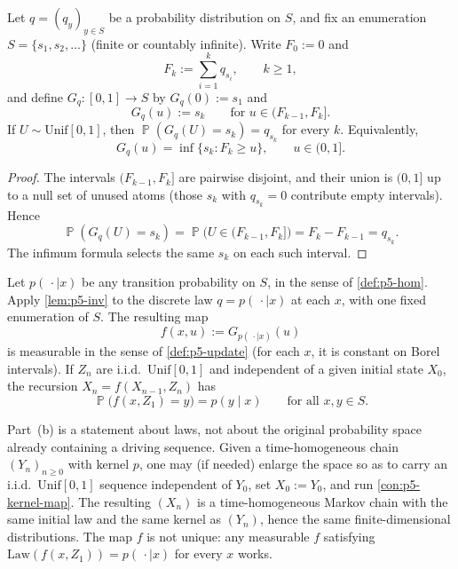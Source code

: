 \documentclass[11pt,a4paper]{article}
\DeclareMathOperator{\Pbb}{\mathbb{P}}
\begin{document}
\begin{lemma}
\label{lem:p5-inv}
Let \(q=(q_y)_{y\in S}\) be a probability distribution on \(S\), and fix an enumeration \(S=\{s_1,s_2,\dots\}\) (finite or countably infinite). Write \(F_0:=0\) and
\[
F_k
:=
\sum_{i=1}^{k}q_{s_i},
\qquad k\ge 1,
\]
and define \(G_q:[0,1]\to S\) by \(G_q(0):=s_1\) and
\[
G_q(u)
:=
s_k
\qquad\text{for }u\in(F_{k-1},F_k].
\]
If \(U\sim\mathrm{Unif}[0,1]\), then \(\Pbb(G_q(U)=s_k)=q_{s_k}\) for every \(k\). Equivalently,
\[
G_q(u)
=
\inf\bigl\{s_k:F_k\ge u\bigr\},
\qquad u\in(0,1].
\]
\end{lemma}

\begin{proof}
The intervals \((F_{k-1},F_k]\) are pairwise disjoint, and their union is \((0,1]\) up to a null set of unused atoms (those \(s_k\) with \(q_{s_k}=0\) contribute empty intervals). Hence
\[
\Pbb(G_q(U)=s_k)
=
\Pbb\bigl(U\in(F_{k-1},F_k]\bigr)
=
F_k-F_{k-1}
=
q_{s_k}.
\]
The infimum formula selects the same \(s_k\) on each such interval.
\end{proof}

\begin{construction}
\label{con:p5-kernel-map}
Let \(p(\,\cdot\mid x)\) be any transition probability on \(S\), in the sense of \cref{def:p5-hom}. Apply \cref{lem:p5-inv} to the discrete law \(q=p(\,\cdot\mid x)\) at each \(x\), with one fixed enumeration of \(S\). The resulting map
\[
f(x,u)
:=
G_{p(\,\cdot\mid x)}(u)
\]
is measurable in the sense of \cref{def:p5-update} (for each \(x\), it is constant on Borel intervals). If \(Z_n\) are i.i.d.\ \(\mathrm{Unif}[0,1]\) and independent of a given initial state \(X_0\), the recursion \(X_n=f(X_{n-1},Z_n)\) has
\[
\Pbb\bigl(f(x,Z_1)=y\bigr)
=
p(y\mid x)
\qquad\text{for all }x,y\in S.
\]
\end{construction}

\begin{remark*}
Part~(b) is a statement about laws, not about the original probability space already containing a driving sequence. Given a time-homogeneous chain \((Y_n)_{n\ge 0}\) with kernel \(p\), one may (if needed) enlarge the space so as to carry an i.i.d.\ \(\mathrm{Unif}[0,1]\) sequence independent of \(Y_0\), set \(X_0:=Y_0\), and run \cref{con:p5-kernel-map}. The resulting \((X_n)\) is a time-homogeneous Markov chain with the same initial law and the same kernel as \((Y_n)\), hence the same finite-dimensional distributions. The map \(f\) is not unique: any measurable \(f\) satisfying \(\mathrm{Law}(f(x,Z_1))=p(\,\cdot\mid x)\) for every \(x\) works.
\end{remark*}
\end{document}
